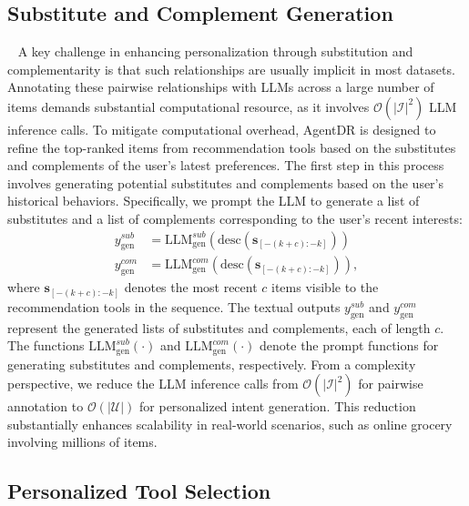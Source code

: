 \subsection{Substitute and Complement Generation}~\label{sec:scgen}
A key challenge in enhancing personalization through substitution and complementarity is that such relationships are usually implicit in most datasets. Annotating these pairwise relationships with LLMs across a large number of items demands substantial computational resource, as it involves $\mathcal{O}(|\mathcal{I}|^2)$ LLM inference calls. To mitigate computational overhead, AgentDR is designed to refine the top-ranked items from recommendation tools based on the substitutes and complements of the user’s latest preferences. The first step in this process involves generating potential substitutes and complements based on the user’s historical behaviors. Specifically, we prompt the LLM to generate a list of substitutes and a list of complements corresponding to the user’s recent interests:
\begin{align}
    y_{\text{gen}}^{sub} &= \text{LLM}_\text{gen}^{sub}(\text{desc}(\mathbf{s}_{[-(k+c):-k]})) \label{eq_agentdr:gen_sub}\\
    y_{\text{gen}}^{com} &= \text{LLM}_\text{gen}^{com}(\text{desc}(\mathbf{s}_{[-(k+c):-k]})), \label{eq_agentdr:gen_com}
\end{align}
where $\mathbf{s}_{[-(k+c):-k]}$ denotes the most recent $c$ items visible to the recommendation tools in the sequence. The textual outputs $y_{\text{gen}}^{sub}$ and $y_{\text{gen}}^{com}$ represent the generated lists of substitutes and complements, each of length $c$. The functions $\text{LLM}_\text{gen}^{sub}(\cdot)$ and $\text{LLM}_\text{gen}^{com}(\cdot)$ denote the prompt functions for generating substitutes and complements, respectively.
From a complexity perspective, we reduce the LLM inference calls from $\mathcal{O}(|\mathcal{I}|^2)$ for pairwise annotation to $\mathcal{O}(|\mathcal{U}|)$ for personalized intent generation. This reduction substantially enhances scalability in real-world scenarios, such as online grocery involving millions of items.


\subsection{Personalized Tool Selection}~\label{sec_tool_select}
